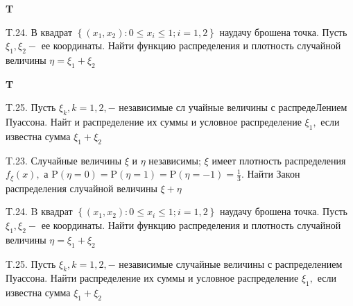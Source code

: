 \documentclass[a4paper,12pt]{article} %
\begin{document}
\begin{example}\textbf{T}

T.24. В квадрат $\left\{\left(x_{1}, x_{2}\right): 0 \leqslant x_{i} \leqslant 1 ; i=1,2\right\}$ наудачу брошена точка. Пусть $\xi_{1}, \xi_{2}-$ ее координаты. Найти функцию распределения и плотность случайной величины $\eta=\xi_{1}+\xi_{2}$


\end{example}


\begin{example}\textbf{T}

T.25. Пусть $\xi_{k}, k=1,2,-$ независимые сл учайные величины с распредеЛением Пуассона. Найт и распределение их суммы и условное распределение $\xi_{1},$ если известна сумма $\xi_{1}+\xi_{2}$


\end{example}



\begin{example}

T.23. Случайные величины $\xi$ и $\eta$ независимы; $\xi$ имеет плотность распределения $f_{\xi}(x),$ а $\mathrm{P}(\eta=0)=\mathrm{P}(\eta=1)=\mathrm{P}(\eta=-1)=\frac{1}{3} .$ Найти Закон
распределения случайной величины $\xi+\eta$




\end{example}



\begin{example}

T.24. $\mathrm{B}$ квадрат $\left\{\left(x_{1}, x_{2}\right): 0 \leqslant x_{i} \leqslant 1 ; i=1,2\right\}$ наудачу брошена точка. Пусть $\xi_{1}, \xi_{2}-$ ее координаты. Найти функцию распределения и плотность случайной величины $\eta=\xi_{1}+\xi_{2}$




\end{example}



\begin{example}


T.25. Пусть $\xi_{k}, k=1,2,-$ независимые случайные величины с распределением Пуассона. Найти распределение их суммы и условное распределение $\xi_{1},$ если известна сумма $\xi_{1}+\xi_{2}$



\end{example}
\end{document}
